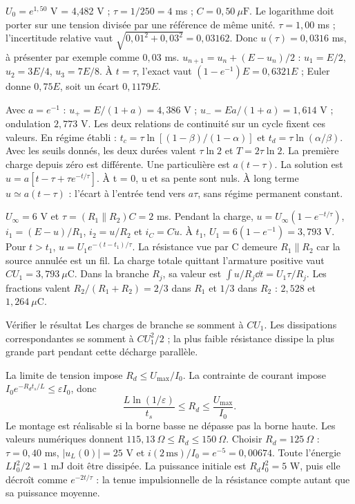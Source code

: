 $U_0=e^{1{,}50}$ V = 4,482 V ; $\tau=1/250=4$ ms ; $C=0{,}50\ \mu\mathrm{ F}$. Le logarithme doit porter sur une tension divisée par une référence de même unité.
$\tau=1{,}00$ ms ; l’incertitude relative vaut $\sqrt{0{,}01^2+0{,}03^2}=0{,}03162$. Donc $u(\tau)=0{,}0316$ ms, à présenter par exemple comme $0{,}03$ ms.
$u_{n+1}=u_n+(E-u_n)/2$ : $u_1=E/2$, $u_2=3E/4$, $u_3=7E/8$. À $t=\tau$, l’exact vaut $(1-e^{-1})E=0{,}6321E$ ; Euler donne $0{,}75E$, soit un écart $0{,}1179E$.


Avec $a=e^{-1}$ : $u_+=E/(1+a)=4{,}386$ V ; $u_-=Ea/(1+a)=1{,}614$ V ; ondulation $2{,}773$ V. Les deux relations de continuité sur un cycle fixent ces valeurs.
En régime établi : $t_c=\tau\ln[(1-\beta)/(1-\alpha)]$ et $t_d=\tau\ln(\alpha/\beta)$. Avec les seuils donnés, les deux durées valent $\tau\ln2$ et $T=2\tau\ln2$. La première charge depuis zéro est différente.
Une particulière est $a(t-\tau)$. La solution est $u=a[t-\tau+\tau e^{-t/\tau}]$. À t = 0, u et sa pente sont nuls. À long terme $u\simeq a(t-\tau)$ : l’écart à l’entrée tend vers $a\tau$, sans régime permanent constant.


$U_\infty=6$ V et $\tau=(R_1\parallel R_2)C=2$ ms. Pendant la charge, $u=U_\infty(1-e^{-t/\tau})$, $i_1=(E-u)/R_1$, $i_2=u/R_2$ et $i_C=C\dot u$.
À $t_1$, $U_1=6(1-e^{-1})=3{,}793$ V. Pour $t>t_1$, $u=U_1e^{-(t-t_1)/\tau}$. La résistance vue par C demeure $R_1\parallel R_2$ car la source annulée est un fil.
La charge totale quittant l’armature positive vaut $CU_1=3{,}793\ \mu\mathrm{ C}$. Dans la branche $R_j$, sa valeur est $\int u/R_j\dd t=U_1\tau/R_j$. Les fractions valent $R_2/(R_1+R_2)=2/3$ dans $R_1$ et $1/3$ dans $R_2$ : $2{,}528$ et $1{,}264\ \mu\mathrm{ C}$.
\begin{methode}{Vérifier le résultat}
Les charges de branche se somment à $CU_1$. Les dissipations correspondantes se somment à $CU_1^2/2$ ; la plus faible résistance dissipe la plus grande part pendant cette décharge parallèle.
\end{methode}


La limite de tension impose $R_d\leq U_{\max}/I_0$. La contrainte de courant impose $I_0e^{-R_dt_s/L}\leq\varepsilon I_0$, donc
\[\frac{L\ln(1/\varepsilon)}{t_s}\leq R_d\leq\frac{U_{\max}}{I_0}.\]
Le montage est réalisable si la borne basse ne dépasse pas la borne haute. Les valeurs numériques donnent $115{,}13\ \Omega\leq R_d\leq150\ \Omega$. Choisir $R_d=125\ \Omega$ : $\tau=0{,}40$ ms, $|u_L(0)|=25$ V et $i(2\,\mathrm{ms})/I_0=e^{-5}=0{,}00674$.
Toute l’énergie $LI_0^2/2=1$ mJ doit être dissipée. La puissance initiale est $R_dI_0^2=5$ W, puis elle décroît comme $e^{-2t/\tau}$ : la tenue impulsionnelle de la résistance compte autant que sa puissance moyenne.


